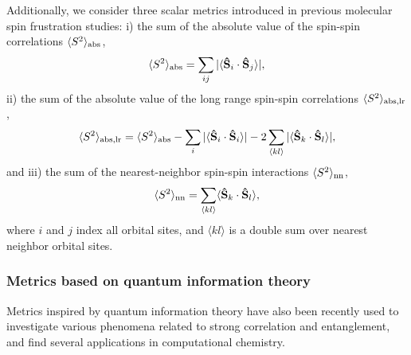\documentclass[aip,jcp,amsmath,amssymb, preprint]{revtex4-1}
\begin{document}
Additionally, we consider three scalar metrics introduced in previous molecular spin frustration studies: i) the sum of the absolute value of the spin-spin correlations $\langle S^2 \rangle_{\rm{abs}}$,\cite{Hoyos2014PolyradicalCharacter}
\begin{equation}
\label{eq:S_sq_abs}
\langle S^2 \rangle_{\rm{abs}} = \sum_{ij} |  \langle \mathbf{\hat{S}}_{i} \cdot \mathbf{\hat{S}}_{j} \rangle |,
\end{equation}
ii) the sum of the absolute value of the long range spin-spin correlations $\langle S^2 \rangle_{\rm{abs,lr}}$, 
\begin{equation}
\label{eq:S_sq_abs_lr}
\langle S^2 \rangle_{\rm{abs,lr}} = \langle S^2 \rangle_{\rm{abs}} - \sum_{i} |  \langle \mathbf{\hat{S}}_{i} \cdot \mathbf{\hat{S}}_{i} \rangle | - 2\sum_{\langle kl \rangle} |  \langle \mathbf{\hat{S}}_{k} \cdot \mathbf{\hat{S}}_{l} \rangle |,
\end{equation} 
and iii) the sum of the nearest-neighbor spin-spin interactions $\langle S^2 \rangle_{\rm{nn}}$, 
\begin{equation}
\label{eq:S_sq_nn}
\langle S^2 \rangle_{\rm{nn}} = \sum_{\langle kl \rangle}  \langle \mathbf{\hat{S}}_{k} \cdot \mathbf{\hat{S}}_{l} \rangle,
\end{equation}
where $i$ and $j$ index all orbital sites, and $\langle kl \rangle$ is a double sum over nearest neighbor orbital sites.


\subsubsection{Metrics based on quantum information theory}

Metrics inspired by quantum information theory have also been recently used to investigate various phenomena related to strong correlation and entanglement,\cite{Boguslawski2015OrbtitalEntanglement}
and find several applications in computational chemistry.\cite{Boguslawski2013OrbitalEntanglement,stein2017automated,fertitta2014investigation,Legeza2003OptemizingThe, Rissler2006MeasuringOrbital} 
\end{document}
